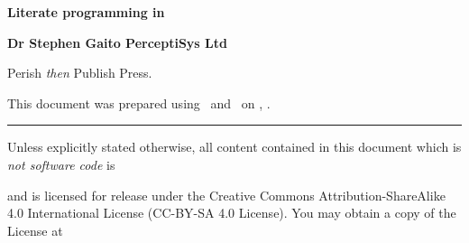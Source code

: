 
\startmakeup

\blank[5cm]
  
\startalignment[center]
\dontleavehmode
\tfd\bf
Literate programming in \ConTeXt
\stopalignment

\blank[1cm]

\startalignment[center]
\dontleavehmode
\tfc\bf
\stopalignment

\blank[1cm]

\startalignment[center]
\dontleavehmode
\tfb\bf
\stopalignment

\blank[8cm]

\startalignment[flushright]
\dontleavehmode
\tfa\bf
\bTABLE
  \setupTABLE[r][each][frame=off]
  \bTR \bTD Dr Stephen Gaito \eTD \eTR
  \bTR \bTD PerceptiSys Ltd \eTD \eTR
  \bTR \bTD \date \eTD \eTR
\eTABLE
\stopalignment

\blank[5cm]

\startalignment[center]
Perish \emph{then} Publish Press.
\stopalignment

\stopmakeup

\startmakeup

\blank[6cm]



This document was prepared using \ConTeXt\ and \LuaTeX\ on 
\currentdate[month] \currentdate[day], \currentdate[year].


\blank

\hrule
\blank[medium]

Unless explicitly stated otherwise, all content contained in this
document which is \emph{not software code} is

\blank[small]

\startcenteraligned
{}
\stopcenteraligned

\blank[small]

and is licensed for release under the Creative Commons
Attribution-ShareAlike 4.0 International License (CC-BY-SA 4.0 License).
You may obtain a copy of the License at

\blank[small]

\startcenteraligned
{}
\stopcenteraligned

